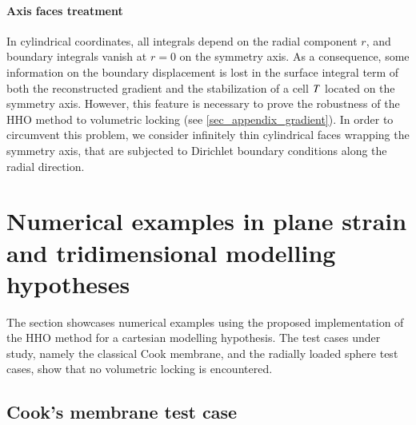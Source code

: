 \paragraph{Axis faces treatment}

In cylindrical coordinates, all integrals depend on the radial component $r$, and boundary integrals vanish at $r = 0$ on the symmetry axis.
As a consequence, some information on the boundary displacement is lost in the surface integral term of both the reconstructed gradient and the stabilization of a cell $T$ located on the symmetry axis.
However, this feature is necessary to prove the robustness of the HHO method to volumetric locking (see \ref{sec_appendix_gradient}).
In order to circumvent this problem, we consider infinitely thin cylindrical faces wrapping the symmetry axis, that are subjected to Dirichlet boundary conditions along the radial direction.

\section{Numerical examples in plane strain and tridimensional modelling hypotheses}
\label{sec_implementation_tridimensional_results}

The section showcases numerical examples
using the proposed implementation of the HHO method
for a cartesian modelling hypothesis.
The test cases under study, namely the
classical Cook membrane, and the radially loaded sphere test cases, show that no
volumetric locking is encountered.

\subsection{Cook's membrane test case}

